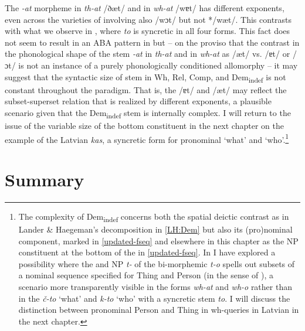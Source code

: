 \noindent The \textit{-at} morpheme in \textit{th-at} /ðæt/ and in \textit{wh-at} /wɐt/ has different exponents, even across the varieties of  involving also /wɔt/ but not */wæt/. This contrasts with what we observe in , where \textit{to} is syncretic in all four forms. This fact does not seem to result in an ABA pattern  in  but -- on the proviso that the contrast in the phonological shape of the stem \textit{-at} in \textit{th-at} and in \textit{wh-at} as /æt/ vs. /ɐt/ or /ɔt/ is not an instance of a purely phonologically conditioned  allomorphy -- it may suggest that the syntactic size of stem in Wh, Rel, Comp, and Dem\textsubscript{indef} is not constant throughout the  paradigm. That is, the  /ɐt/ and /æt/ may reflect the subset-superset relation that is realized by different exponents, a plausible scenario given that the Dem\textsubscript{indef} stem is internally complex. I will return to the issue of the variable size of the bottom constituent in the next chapter on the example of the Latvian \textit{kas}, a syncretic form for pronominal `what' and `who'.\footnote{\label{FN:differentbottoms}The complexity of Dem\textsubscript{indef} concerns both the spatial deictic contrast as in Lander \& Haegeman's \citeyearpar{Lander-Haegeman2016} decomposition in \ref{LH:Dem} but also its (pro)nominal component, marked in \ref{updated-fseq} and elsewhere in this chapter as the NP constituent at the bottom of the  in \ref{updated-fseq}. In \cite{Wiland-PSiCL} I have explored a possibility where the  and  NP \textit{t-} of the bi-morphemic \textit{t-o} spells out subsets of a nominal sequence specified for Thing and Person (in the sense of \citeauthor{Cysouw2004} \citeyear{Cysouw2004,Cysouw2005}), a scenario more transparently visible in the  forms \textit{wh-at} and \textit{wh-o} rather than in the  \textit{\v{c}-to} `what' and \textit{k-to} `who' with a syncretic stem \textit{to}. I will discuss the distinction between pronominal Person and Thing in wh-queries in Latvian in the next chapter.
} %



\section{Summary}

